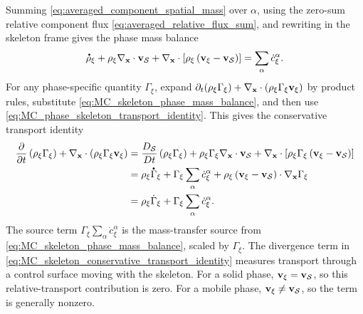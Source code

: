Summing \eqref{eq:averaged_component_spatial_mass} over \(\alpha\), using the
zero-sum relative component flux \eqref{eq:averaged_relative_flux_sum}, and
rewriting in the skeleton frame gives the phase mass balance
%
\begin{equation}
	\phasedot\rho_\xi
	+
	\rho_\xi\nabla_{\mbf x}\cdot\mbf v_{\mc S}
	+
	\nabla_{\mbf x}\cdot
	\left[
		\rho_\xi
		\left(
		\mbf v_\xi-\mbf v_{\mc S}
		\right)
	\right]
	=
	\sum_\alpha\dot{c}_\xi^\alpha .
	\label{eq:MC_skeleton_phase_mass_balance}
\end{equation}
%
For any phase-specific quantity \(\Gamma_\xi\), expand
\(\partial_t(\rho_\xi\Gamma_\xi)+\nabla_{\mathbf{x}}\cdot(\rho_\xi\Gamma_\xi\mathbf{v}_\xi)\)
by product rules, substitute
\eqref{eq:MC_skeleton_phase_mass_balance}, and then use
\eqref{eq:MC_phase_skeleton_transport_identity}.  This gives the conservative
transport identity
%
\begin{align}
	\frac{\partial}{\partial t}
	\left(
	\rho_\xi\Gamma_\xi
	\right)
	+
	\nabla_{\mbf x}\cdot
	\left(
	\rho_\xi\Gamma_\xi\mbf v_\xi
	\right)
	={}&
	\frac{D_{\mc S}}{Dt}
	\left(
	\rho_\xi\Gamma_\xi
	\right)
	+
	\rho_\xi\Gamma_\xi
	\nabla_{\mbf x}\cdot\mbf v_{\mc S}
	+
	\nabla_{\mbf x}\cdot
	\left[
		\rho_\xi\Gamma_\xi
		\left(
		\mbf v_\xi-\mbf v_{\mc S}
		\right)
	\right]
	\notag \\
	={}&
	\rho_\xi\phasedot\Gamma_\xi
	+
	\Gamma_\xi
	\sum_\alpha\dot{c}_\xi^\alpha
	+
	\rho_\xi
	\left(
	\mbf v_\xi-\mbf v_{\mc S}
	\right)\cdot
	\nabla_{\mbf x}\Gamma_\xi
	\notag \\
	={}&
	\rho_\xi\dot{\Gamma}_\xi
	+
	\Gamma_\xi
	\sum_\alpha\dot{c}_\xi^\alpha .
	\label{eq:MC_skeleton_conservative_transport_identity}
\end{align}
%
The source term \(\Gamma_\xi\sum_\alpha\dot c_\xi^\alpha\) is the
mass-transfer source from \eqref{eq:MC_skeleton_phase_mass_balance}, scaled by
\(\Gamma_\xi\).  The divergence term in
\eqref{eq:MC_skeleton_conservative_transport_identity} measures transport
through a control surface moving with the skeleton.  For a solid phase,
\(\mathbf{v}_\xi=\mathbf{v}_{\mathcal{S}}\), so this relative-transport contribution is
zero.  For a mobile phase, \(\mathbf{v}_\xi\neq\mathbf{v}_{\mathcal{S}}\), so the term is
generally nonzero.

